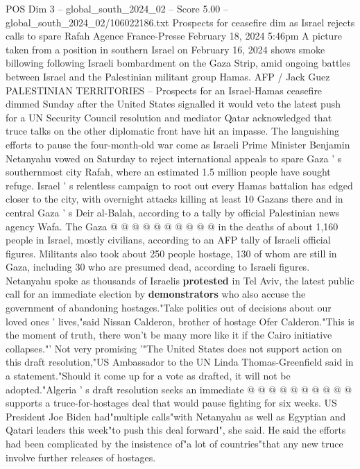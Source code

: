 \begin{textsample}{POS Dim 3 – global\_south\_2024\_02 – Score 5.00 – global\_south\_2024\_02/106022186.txt}  \label{ex:f3_pos_367}
Prospects for ceasefire dim as Israel rejects calls to spare Rafah Agence France-Presse February 18, 2024 5:46pm A picture taken from a position in southern Israel on February 16, 2024 shows smoke billowing following Israeli bombardment on the Gaza Strip, amid ongoing battles between Israel and the Palestinian militant group Hamas.
AFP / Jack Guez PALESTINIAN TERRITORIES -- Prospects for an Israel-Hamas ceasefire dimmed Sunday after the United States signalled it would veto the latest push for a UN Security Council resolution and mediator Qatar acknowledged that truce talks on the other diplomatic front have hit an impasse.
The languishing efforts to pause the four-month-old war come as Israeli Prime Minister Benjamin Netanyahu vowed on Saturday to reject international appeals to spare Gaza ' s southernmost city Rafah, where an estimated 1.5 million people have sought refuge.
Israel ' s relentless campaign to root out every Hamas battalion has edged closer to the city, with overnight attacks killing at least 10 Gazans there and in central Gaza ' s Deir al-Balah, according to a tally by official Palestinian news agency Wafa.
The Gaza @ @ @ @ @ @ @ @ @ @ in the deaths of about 1,160 people in Israel, mostly civilians, according to an AFP tally of Israeli official figures.
Militants also took about 250 people hostage, 130 of whom are still in Gaza, including 30 who are presumed dead, according to Israeli figures.
Netanyahu spoke as thousands of Israelis \textbf{protested} in Tel Aviv, the latest public call for an immediate election by \textbf{demonstrators} who also accuse the government of abandoning hostages."Take politics out of decisions about our loved ones ' lives,"said Nissan Calderon, brother of hostage Ofer Calderon."This is the moment of truth, there won't be many more like it if the Cairo initiative collapses."' Not very promising '"The United States does not support action on this draft resolution,"US Ambassador to the UN Linda Thomas-Greenfield said in a statement."Should it come up for a vote as drafted, it will not be adopted."Algeria ' s draft resolution seeks an immediate @ @ @ @ @ @ @ @ @ @ supports a truce-for-hostages deal that would pause fighting for six weeks.
US President Joe Biden had"multiple calls"with Netanyahu as well as Egyptian and Qatari leaders this week"to push this deal forward", she said.
He said the efforts had been complicated by the insistence of"a lot of countries"that any new truce involve further releases of hostages.

\end{textsample}
